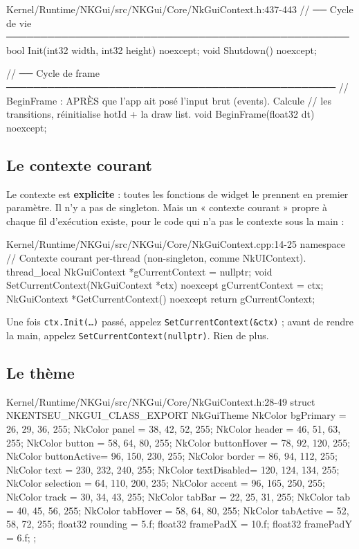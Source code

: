 \begin{nkcode}{Kernel/Runtime/NKGui/src/NKGui/Core/NkGuiContext.h:437-443}
                // ── Cycle de vie ──────────────────────────────────────────────────
                bool Init(int32 width, int32 height) noexcept;
                void Shutdown() noexcept;

                // ── Cycle de frame ────────────────────────────────────────────────
                // BeginFrame : APRÈS que l'app ait posé l'input brut (events). Calcule
                // les transitions, réinitialise hotId + la draw list.
                void BeginFrame(float32 dt) noexcept;
\end{nkcode}

\subsection{Le contexte courant}

Le contexte est \textbf{explicite} : toutes les fonctions de widget le prennent
en premier paramètre. Il n'y a pas de singleton. Mais un « contexte courant »
propre à chaque fil d'exécution existe, pour le code qui n'a pas le contexte sous
la main :

\begin{nkcode}{Kernel/Runtime/NKGui/src/NKGui/Core/NkGuiContext.cpp:14-25}
namespace {
    // Contexte courant per-thread (non-singleton, comme NkUIContext).
    thread_local NkGuiContext *gCurrentContext = nullptr;
}
void SetCurrentContext(NkGuiContext *ctx) noexcept { gCurrentContext = ctx; }
NkGuiContext *GetCurrentContext() noexcept { return gCurrentContext; }
\end{nkcode}

Une fois \texttt{ctx.Init(\dots)} passé, appelez
\texttt{SetCurrentContext(\&ctx)} ; avant de rendre la main, appelez
\texttt{SetCurrentContext(nullptr)}. Rien de plus.

\subsection{Le thème}

\begin{nkcode}{Kernel/Runtime/NKGui/src/NKGui/Core/NkGuiContext.h:28-49}
struct NKENTSEU_NKGUI_CLASS_EXPORT NkGuiTheme {
        NkColor bgPrimary   = {26, 29, 36, 255};
        NkColor panel       = {38, 42, 52, 255};
        NkColor header      = {46, 51, 63, 255};
        NkColor button      = {58, 64, 80, 255};
        NkColor buttonHover = {78, 92, 120, 255};
        NkColor buttonActive= {96, 150, 230, 255};
        NkColor border      = {86, 94, 112, 255};
        NkColor text        = {230, 232, 240, 255};
        NkColor textDisabled= {120, 124, 134, 255};
        NkColor selection   = {64, 110, 200, 235};
        NkColor accent      = {96, 165, 250, 255};
        NkColor track       = {30, 34, 43, 255};
        NkColor tabBar      = {22, 25, 31, 255};
        NkColor tab         = {40, 45, 56, 255};
        NkColor tabHover    = {58, 64, 80, 255};
        NkColor tabActive   = {52, 58, 72, 255};
        float32 rounding  = 5.f;
        float32 framePadX = 10.f;
        float32 framePadY = 6.f;
};
\end{nkcode}

